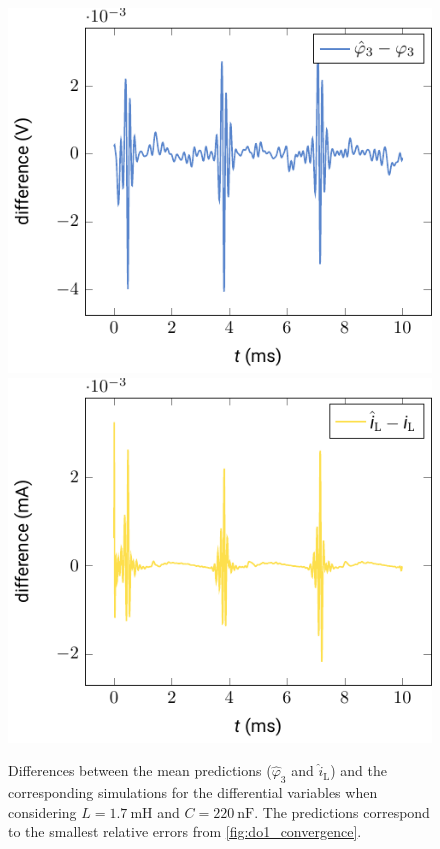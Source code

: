 \documentclass[AMA,STIX1COL]{WileyNJD-v2}
\newcommand{\mr}[1]{\mathrm{#1}}
\begin{document}
\begin{figure}[t]
    \begin{center}
        \includegraphics[width=.4\textwidth]{do1_error_phi_3} \hspace{1.5cm} \includegraphics[width=.4\textwidth]{do1_error_i_L}
    \end{center}
    \caption{Differences between the mean predictions ($\hat{\varphi}_3$ and $\hat{i}_\mr{L}$) and the corresponding simulations for the differential variables when considering $L = \SI{1.7}{\milli\henry}$ and $C = \SI{220}{\nano\farad}$. The predictions correspond to the smallest relative errors from \autoref{fig:do1_convergence}.}
    \label{fig:do1_error_d}
\end{figure}
\end{document}
